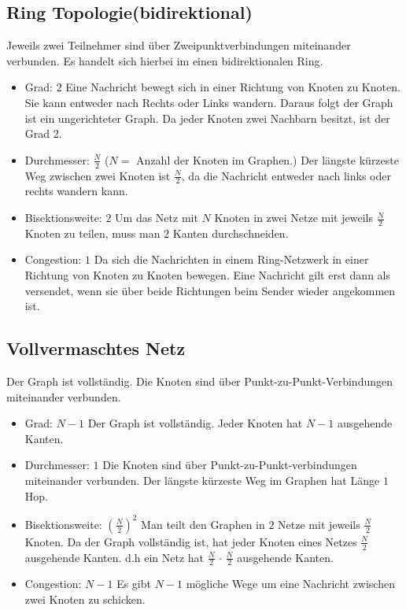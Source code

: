 \subsection{Ring Topologie(bidirektional)}
 Jeweils zwei Teilnehmer sind über Zweipunktverbindungen miteinander verbunden.
 Es handelt sich hierbei im einen bidirektionalen Ring.
\begin{itemize}
  \item Grad: $2$
  \newline Eine Nachricht bewegt sich in einer Richtung von Knoten zu Knoten.
  Sie kann entweder nach Rechts oder Links wandern. Daraus folgt der Graph ist
  ein ungerichteter Graph. Da jeder Knoten zwei Nachbarn besitzt, ist der Grad 2.
  \item Durchmesser: $\frac{N}{2}$ ($N =$ Anzahl der Knoten im Graphen.)
   \newline Der längste kürzeste Weg zwischen zwei Knoten ist $\frac{N}{2}$, da
   die Nachricht entweder nach links oder rechts wandern kann.
  \item Bisektionsweite: $2$
  \newline  Um das Netz mit $N$ Knoten in zwei Netze mit jeweils $\frac{N}{2}$
  Knoten zu teilen, muss man $2$ Kanten durchschneiden.
  \item Congestion: $1$
  \newline Da sich die Nachrichten in einem Ring-Netzwerk in einer Richtung von
  Knoten zu Knoten bewegen. Eine Nachricht gilt erst dann als versendet, wenn
  sie über beide Richtungen beim Sender wieder angekommen ist.
\end{itemize}

\subsection{Vollvermaschtes Netz}
Der Graph ist vollständig. Die Knoten sind über Punkt-zu-Punkt-Verbindungen
miteinander verbunden.
\begin{itemize}
  \item Grad: $N-1$
  \newline Der Graph ist vollständig. Jeder Knoten hat $N-1$ ausgehende Kanten.
  \item Durchmesser: $1$
   \newline Die Knoten sind über Punkt-zu-Punkt-verbindungen miteinander
   verbunden. Der längste kürzeste Weg  im Graphen hat Länge $1$ Hop.
  \item Bisektionsweite: $ \left( \frac{N}{2}\right)^2$
  \newline Man teilt den Graphen in $2$ Netze mit jeweils $\frac{N}{2}$ Knoten.
  Da der Graph vollständig ist, hat jeder Knoten eines Netzes  $\frac{N}{2}$
  ausgehende Kanten. d.h ein Netz hat $\frac{N}{2} \, \cdot \, \frac{N}{2}$
  ausgehende Kanten.
  \item Congestion: $N-1$
  \newline Es gibt $N-1$ mögliche Wege um eine Nachricht zwischen zwei Knoten zu
  schicken.
\end{itemize}


